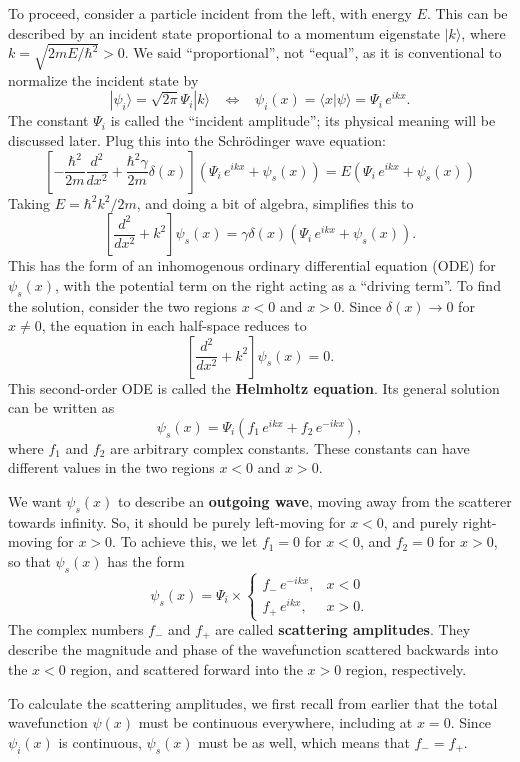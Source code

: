 \documentclass[pra,12pt]{revtex4}
\begin{document}
To proceed, consider a particle incident from the left, with energy
$E$.  This can be described by an incident state proportional to a
momentum eigenstate $|k\rangle$, where $k = \sqrt{2mE/\hbar^2} > 0$.
We said ``proportional'', not ``equal'', as it is conventional to
normalize the incident state by
$$|\psi_i\rangle = \sqrt{2\pi}\Psi_i |k\rangle \;\;\; \Leftrightarrow\;\;\; \psi_i(x) = \langle x|\psi\rangle = \Psi_i \, e^{ik x}.$$
The constant $\Psi_i$ is called the ``incident amplitude''; its
physical meaning will be discussed later.  Plug this into the
Schr\"odinger wave equation:
$$\left[-\frac{\hbar^2}{2m} \frac{d^2}{dx^2} + \frac{\hbar^2\gamma}{2m}\delta(x)\right] \left(\Psi_i \, e^{ikx} + \psi_s(x) \right) = E \left(\Psi_i \, e^{ikx} + \psi_s(x) \right)$$
Taking $E = \hbar^2k^2/2m$, and doing a bit of algebra, simplifies this to
$$\left[ \frac{d^2}{dx^2} + k^2\right] \psi_s(x) =  \gamma \delta(x) \left(\Psi_i \, e^{ikx} + \psi_s(x) \right).$$
This has the form of an inhomogenous ordinary differential equation (ODE)
for $\psi_s(x)$, with the potential term on the right acting
as a ``driving term''.  To find the solution, consider the two regions $x <
0$ and $x > 0$.  Since $\delta(x) \rightarrow 0$ for $x \ne 0$, the
equation in each half-space reduces to
$$\left[\frac{d^2}{dx^2} + k^2\right] \psi_s(x) = 0.$$
This second-order ODE is called the \textbf{Helmholtz equation}.  Its
general solution can be written as
$$\psi_s(x) = \Psi_i \left(f_1 \, e^{ik x} + f_2 \, e^{-ik x}\right),$$
where $f_1$ and $f_2$ are arbitrary complex constants.  These
constants can have different values in the two regions $x < 0$ and $x
> 0$.

We want $\psi_s(x)$ to describe an \textbf{outgoing wave}, moving away
from the scatterer towards infinity.  So, it should be purely
left-moving for $x < 0$, and purely right-moving for $x > 0$.  To
achieve this, we let $f_1 = 0$ for $x < 0$, and $f_2 = 0$ for $x > 0$,
so that $\psi_s(x)$ has the form
$$\psi_s(x) = \Psi_i \times \begin{cases}f_- \,e^{-ikx}, & x < 0 \\ f_+ \,e^{ikx}, & x > 0.\end{cases}$$
The complex numbers $f_-$ and $f_+$ are called \textbf{scattering
  amplitudes}.  They describe the magnitude and phase of the
wavefunction scattered backwards into the $x<0$ region, and scattered
forward into the $x > 0$ region, respectively.

To calculate the scattering amplitudes, we first recall from earlier
that the total wavefunction $\psi(x)$ must be continuous everywhere,
including at $x = 0$.  Since $\psi_i(x)$ is continuous, $\psi_s(x)$
must be as well, which means that $f_- = f_+$.
\end{document}

